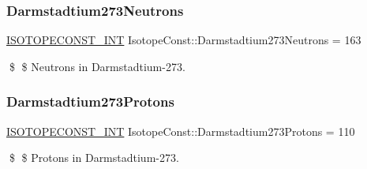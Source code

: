 \subsubsection{\texorpdfstring{Darmstadtium273\+Neutrons}{Darmstadtium273Neutrons}}
{\footnotesize\ttfamily \mbox{\hyperlink{group___isotope_const-_macros_ga5f18360b3e99483a35c32d789e62621c}{I\+S\+O\+T\+O\+P\+E\+C\+O\+N\+S\+T\+\_\+\+I\+NT}} Isotope\+Const\+::\+Darmstadtium273\+Neutrons = 163}

\$ \$ Neutrons in Darmstadtium-\/273. \mbox{\label{group___isotope_const-_darmstadtium-_ds273_ga14cd94d6518ea093d49a697b1265bbdd}} 
\subsubsection{\texorpdfstring{Darmstadtium273\+Protons}{Darmstadtium273Protons}}
{\footnotesize\ttfamily \mbox{\hyperlink{group___isotope_const-_macros_ga5f18360b3e99483a35c32d789e62621c}{I\+S\+O\+T\+O\+P\+E\+C\+O\+N\+S\+T\+\_\+\+I\+NT}} Isotope\+Const\+::\+Darmstadtium273\+Protons = 110}

\$ \$ Protons in Darmstadtium-\/273. 
